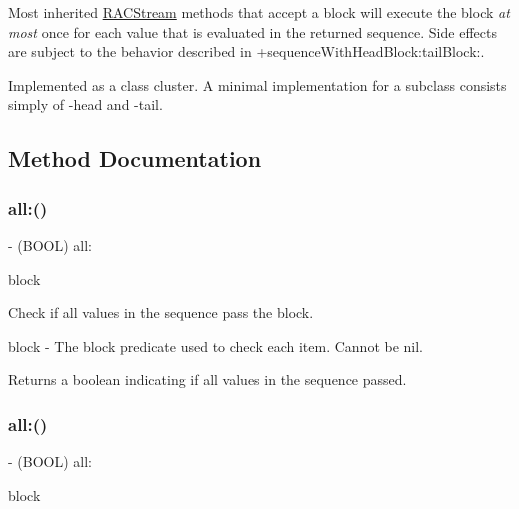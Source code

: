 Most inherited \mbox{\hyperlink{interface_r_a_c_stream}{R\+A\+C\+Stream}} methods that accept a block will execute the block {\itshape at most} once for each value that is evaluated in the returned sequence. Side effects are subject to the behavior described in +sequence\+With\+Head\+Block\+:tail\+Block\+:.

Implemented as a class cluster. A minimal implementation for a subclass consists simply of -\/head and -\/tail. 

\subsection{Method Documentation}
\mbox{\label{interface_r_a_c_sequence_a1042435c369460def379265597a1cfb0}} 
\subsubsection{\texorpdfstring{all\+:()}{all:()}\hspace{0.1cm}{\footnotesize\ttfamily [1/3]}}
{\footnotesize\ttfamily -\/ (B\+O\+OL) all\+: \begin{DoxyParamCaption}\item[{(B\+O\+OL($^\wedge$)(id value))}]{block }\end{DoxyParamCaption}}

Check if all values in the sequence pass the block.

block -\/ The block predicate used to check each item. Cannot be nil.

Returns a boolean indicating if all values in the sequence passed. \mbox{\label{interface_r_a_c_sequence_a1042435c369460def379265597a1cfb0}} 
\subsubsection{\texorpdfstring{all\+:()}{all:()}\hspace{0.1cm}{\footnotesize\ttfamily [2/3]}}
{\footnotesize\ttfamily -\/ (B\+O\+OL) all\+: \begin{DoxyParamCaption}\item[{(B\+O\+OL($^\wedge$)(id value))}]{block }\end{DoxyParamCaption}}

